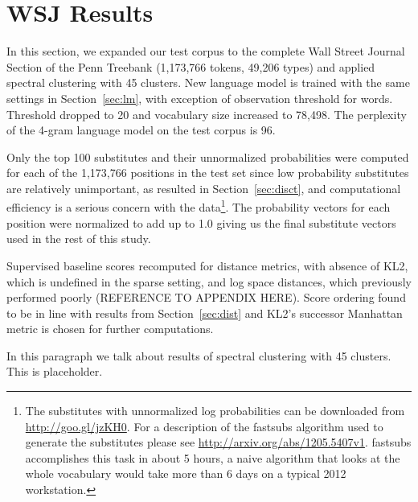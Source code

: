 \section{WSJ Results}
\label{sec:wsj}

In this section, we expanded our test corpus to the complete Wall
Street Journal Section of the Penn Treebank \cite{treebank3}
(1,173,766 tokens, 49,206 types) and applied spectral clustering
with 45 clusters.
%
New language model is trained with the same settings in
Section~\ref{sec:lm}, with exception of observation threshold for
words.  Threshold dropped to 20 and vocabulary size increased to
78,498.
%
The perplexity of the 4-gram language model on the test corpus is 96.

Only the top 100 substitutes and their unnormalized probabilities were
computed for each of the 1,173,766 positions in the test set since low
probability substitutes are relatively unimportant, as resulted in
Section~\ref{sec:disct}, and computational efficiency is a serious
concern with the data\footnote{The substitutes with unnormalized log
  probabilities can be downloaded from
  \mbox{\url{http://goo.gl/jzKH0}}.  For a description of the {\sc
    fastsubs} algorithm used to generate the substitutes please see
  \mbox{\url{http://arxiv.org/abs/1205.5407v1}}.  {\sc fastsubs}
  accomplishes this task in about 5 hours, a naive algorithm that
  looks at the whole vocabulary would take more than 6 days on a
  typical 2012 workstation.}.  The probability vectors for each
position were normalized to add up to 1.0 giving us the final
substitute vectors used in the rest of this study.

Supervised baseline scores recomputed for distance metrics, with
absence of KL2, which is undefined in the sparse setting, and log
space distances, which previously performed poorly (REFERENCE TO
APPENDIX HERE). Score ordering found to be in line with results from
Section~\ref{sec:dist} and KL2's successor Manhattan metric is chosen
for further computations.

In this paragraph we talk about results of spectral clustering with 45
clusters. This is placeholder.
